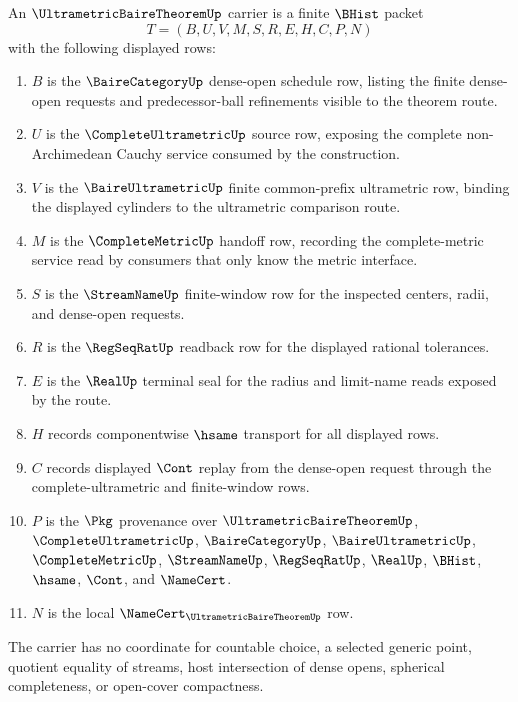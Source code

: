 \begin{definition}
\label{def:ultrametric-baire-theorem-carrier}
An $\UltrametricBaireTheoremUp$ carrier is a finite $\BHist$ packet
$$
T=(B,U,V,M,S,R,E,H,C,P,N)
$$
with the following displayed rows:
\begin{enumerate}
\item $B$ is the $\BaireCategoryUp$ dense-open schedule row, listing the finite dense-open requests and predecessor-ball refinements visible to the theorem route.
\item $U$ is the $\CompleteUltrametricUp$ source row, exposing the complete non-Archimedean Cauchy service consumed by the construction.
\item $V$ is the $\BaireUltrametricUp$ finite common-prefix ultrametric row, binding the displayed cylinders to the ultrametric comparison route.
\item $M$ is the $\CompleteMetricUp$ handoff row, recording the complete-metric service read by consumers that only know the metric interface.
\item $S$ is the $\StreamNameUp$ finite-window row for the inspected centers, radii, and dense-open requests.
\item $R$ is the $\RegSeqRatUp$ readback row for the displayed rational tolerances.
\item $E$ is the $\RealUp$ terminal seal for the radius and limit-name reads exposed by the route.
\item $H$ records componentwise $\hsame$ transport for all displayed rows.
\item $C$ records displayed $\Cont$ replay from the dense-open request through the complete-ultrametric and finite-window rows.
\item $P$ is the $\Pkg$ provenance over $\UltrametricBaireTheoremUp$, $\CompleteUltrametricUp$, $\BaireCategoryUp$, $\BaireUltrametricUp$, $\CompleteMetricUp$, $\StreamNameUp$, $\RegSeqRatUp$, $\RealUp$, $\BHist$, $\hsame$, $\Cont$, and $\NameCert$.
\item $N$ is the local $\NameCert_{\UltrametricBaireTheoremUp}$ row.
\end{enumerate}
The carrier has no coordinate for countable choice, a selected generic point, quotient equality of streams, host intersection of dense opens, spherical completeness, or open-cover compactness.
\end{definition}

